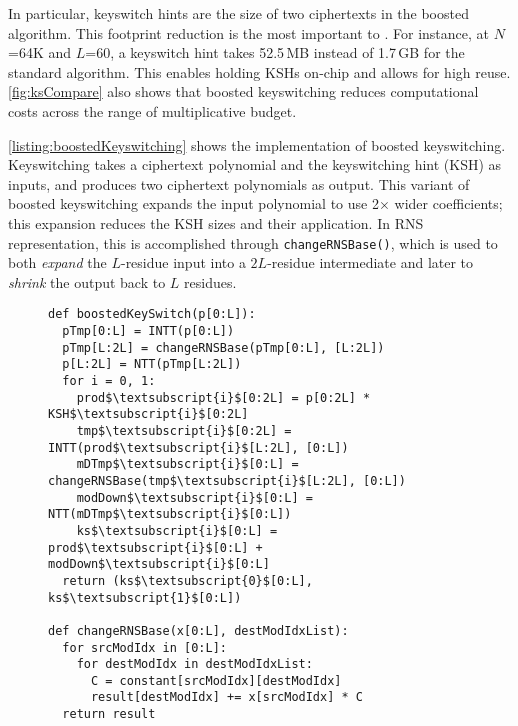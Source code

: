 In particular, keyswitch hints are the size of two ciphertexts in the boosted
algorithm. This footprint reduction is the most important to \name. For
instance, at $N$=64K and $L$=60, a keyswitch hint takes 52.5\,MB instead of
1.7\,GB for the standard algorithm. This enables holding KSHs on-chip and
allows for high reuse. \autoref{fig:ksCompare} also shows that boosted
keyswitching reduces computational costs across the range of multiplicative
budget.

\autoref{listing:boostedKeyswitching} shows the implementation of boosted
keyswitching. Keyswitching takes a ciphertext polynomial and the keyswitching
hint (KSH) as inputs, and produces two ciphertext polynomials as output. This
variant of boosted keyswitching expands the input polynomial to use 2$\times$
wider coefficients; this expansion reduces the KSH sizes and their application.
In RNS representation, this is accomplished through \verb!changeRNSBase()!,
which is used to both \emph{expand} the $L$-residue input into a $2L$-residue
intermediate and later to \emph{shrink} the output back to $L$ residues.

    \begin{figure}\label{lst:boostedKeyswitching}
      \begin{center}
          \begin{lstlisting}[caption={Boosted keyswitching implementation.}, mathescape=true, style=custompython, label=listing:boostedKeyswitching]
def boostedKeySwitch(p[0:L]):
  pTmp[0:L] = INTT(p[0:L])
  pTmp[L:2L] = changeRNSBase(pTmp[0:L], [L:2L])
  p[L:2L] = NTT(pTmp[L:2L])
  for i = 0, 1:
    prod$\textsubscript{i}$[0:2L] = p[0:2L] * KSH$\textsubscript{i}$[0:2L]
    tmp$\textsubscript{i}$[0:2L] = INTT(prod$\textsubscript{i}$[L:2L], [0:L])
    mDTmp$\textsubscript{i}$[0:L] = changeRNSBase(tmp$\textsubscript{i}$[L:2L], [0:L])
    modDown$\textsubscript{i}$[0:L] = NTT(mDTmp$\textsubscript{i}$[0:L])
    ks$\textsubscript{i}$[0:L] = prod$\textsubscript{i}$[0:L] + modDown$\textsubscript{i}$[0:L]
  return (ks$\textsubscript{0}$[0:L], ks$\textsubscript{1}$[0:L])

def changeRNSBase(x[0:L], destModIdxList):
  for srcModIdx in [0:L]:
    for destModIdx in destModIdxList:
      C = constant[srcModIdx][destModIdx]
      result[destModIdx] += x[srcModIdx] * C
  return result
          \end{lstlisting}
        \end{center}
      \end{figure}

\tblOpBalance

